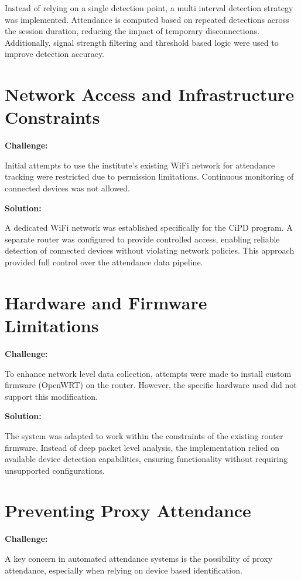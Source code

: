 Instead of relying on a single detection point, a multi interval detection strategy was implemented.
Attendance is computed based on repeated detections across the session duration, reducing the
impact of temporary disconnections. Additionally, signal strength filtering and threshold based logic
were used to improve detection accuracy.

\section{Network Access and Infrastructure Constraints}

\textbf{Challenge:}

Initial attempts to use the institute's existing WiFi network for attendance tracking were restricted
due to permission limitations. Continuous monitoring of connected devices was not allowed.

\textbf{Solution:}

A dedicated WiFi network was established specifically for the CiPD program. A separate router was
configured to provide controlled access, enabling reliable detection of connected devices without
violating network policies. This approach provided full control over the attendance data pipeline.

\section{Hardware and Firmware Limitations}

\textbf{Challenge:}

To enhance network level data collection, attempts were made to install custom firmware
(OpenWRT) on the router. However, the specific hardware used did not support this modification.

\textbf{Solution:}

The system was adapted to work within the constraints of the existing router firmware. Instead of
deep packet level analysis, the implementation relied on available device detection capabilities,
ensuring functionality without requiring unsupported configurations.

\section{Preventing Proxy Attendance}

\textbf{Challenge:}

A key concern in automated attendance systems is the possibility of proxy attendance, especially
when relying on device based identification.

